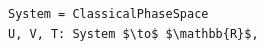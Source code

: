\documentclass[border=10pt]{standalone}
\begin{document}
\begin{lstlisting}
System = ClassicalPhaseSpace
U, V, T: System $\to$ $\mathbb{R}$,
\end{lstlisting}
\end{document}

